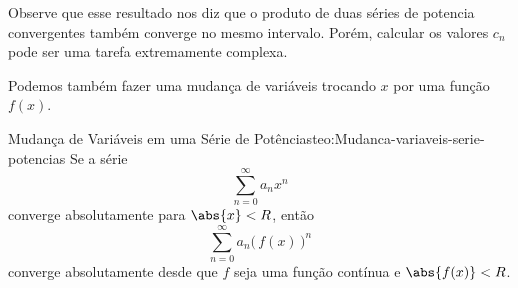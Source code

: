 Observe que esse resultado nos diz que o produto de duas séries de potencia convergentes
também converge no mesmo intervalo. Porém, calcular os valores $c_n$ pode ser uma
tarefa extremamente complexa.

Podemos também fazer uma mudança de variáveis trocando $x$ por uma função $f(x)$.

\begin{teorema}{Mudança de Variáveis em uma Série de Potências}{teo:Mudanca-variaveis-serie-potencias}
	Se a série
	\[
	  \sum_{n=0}^{\infty} a_n x^n
	\]
	converge absolutamente para \(\abs{x}<R\), então
	\[
  	\sum_{n=0}^{\infty} a_n \big(\, f(x) \,\big)^n
	\]
	converge absolutamente desde que $f$ seja uma função contínua e
	\(
    \abs{f(x)}<R
  \).
\end{teorema}


